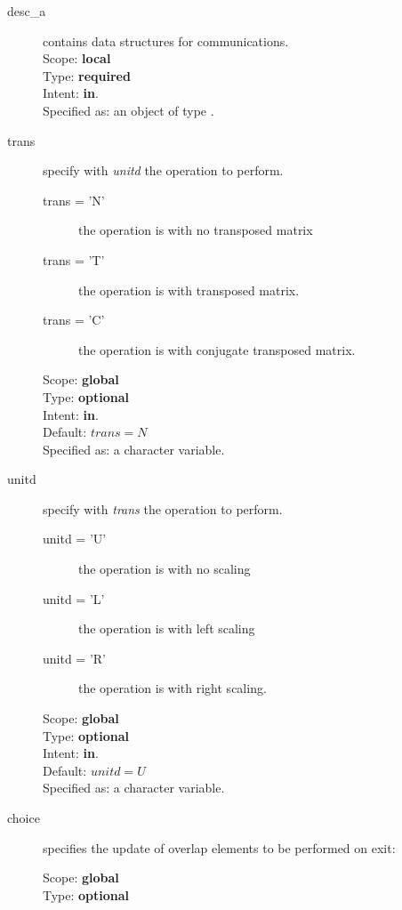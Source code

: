 \begin{description}
\item[desc\_a] contains data structures for communications.\\
Scope: {\bf local} \\
Type: {\bf required}\\
Intent: {\bf in}.\\
Specified as: an object of type \descdata.
\item[trans] specify with {\em unitd} the operation to perform.
\begin{description}
\item[trans = 'N'] the operation is with no transposed matrix
\item[trans = 'T'] the operation is with transposed matrix.
\item[trans = 'C'] the operation is with conjugate transposed matrix.
\end{description}
Scope: {\bf global} \\
Type: {\bf optional}\\
Intent: {\bf in}.\\
Default: $trans = N$\\
Specified as: a character variable.
\item[unitd] specify with {\em trans} the operation to perform.
\begin{description}
\item[unitd = 'U'] the operation is with no scaling
\item[unitd = 'L'] the operation is with left scaling
\item[unitd = 'R'] the operation is with right scaling.
\end{description}
Scope: {\bf global} \\
Type: {\bf optional}\\
Intent: {\bf in}.\\
Default: $unitd = U$\\
Specified as: a character variable.
\item[choice] specifies the update of overlap elements to be performed
  on exit:
Scope: {\bf global} \\
Type: {\bf optional}\\

\end{description}
